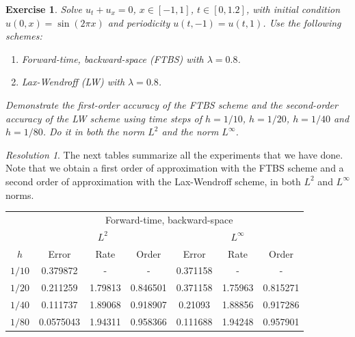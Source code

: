 \documentclass[10pt,a4paper]{article}
\newtheorem{exercici}{Exercise}
\theoremstyle{definition}
\theoremstyle{remark}
\newtheorem*{res}{Resolution}
\begin{document}
\newpage
\setcounter{exercici}{14}
\begin{exercici}
  Solve $u_t+u_x=0$, $x\in[-1,1]$, $t\in[0,1.2]$, with initial condition $u(0,x)=\sin(2\pi x)$ and periodicity $u(t,-1)=u(t,1)$. Use the following schemes:
  \begin{enumerate}
    \item Forward-time, backward-space (FTBS) with $\lambda =0.8$.
    \item Lax-Wendroff (LW) with $\lambda =0.8$.
  \end{enumerate}
  Demonstrate the first-order accuracy of the FTBS scheme and the second-order accuracy of the LW scheme using time steps of $h=1/10$, $h=1/20$, $h=1/40$ and $h=1/80$. Do it in both the norm $L^2$ and the norm $L^\infty$.
\end{exercici}
\begin{res}
  The next tables summarize all the experiments that we have done. Note that we obtain a first order of approximation with the FTBS scheme and a second order of approximation with the Lax-Wendroff scheme, in both $L^2$ and $L^\infty$ norms.
  \begin{table}[ht]
    \centering
    \begin{tabular}{|c||c|c|c|c|c|c|}
      \hline
             & \multicolumn{6}{c|}{Forward-time, backward-space}                                                                              \\
      \cline{2-7}
             & \multicolumn{3}{c|}{$L^2$}                        & \multicolumn{3}{c|}{$L^\infty$}                                            \\
      \cline{2-7}
      $h$    & Error                                             & Rate                            & Order    & Error    & Rate    & Order    \\
      \hline\hline
      $1/10$ & 0.379872                                          & -                               & -        & 0.371158 & -       & -        \\
      $1/20$ & 0.211259                                          & 1.79813                         & 0.846501 & 0.371158 & 1.75963 & 0.815271 \\
      $1/40$ & 0.111737                                          & 1.89068                         & 0.918907 & 0.21093  & 1.88856 & 0.917286 \\
      $1/80$ & 0.0575043                                         & 1.94311                         & 0.958366 & 0.111688 & 1.94248 & 0.957901 \\

\end{tabular}
\end{table}
\end{res}
\end{document}
